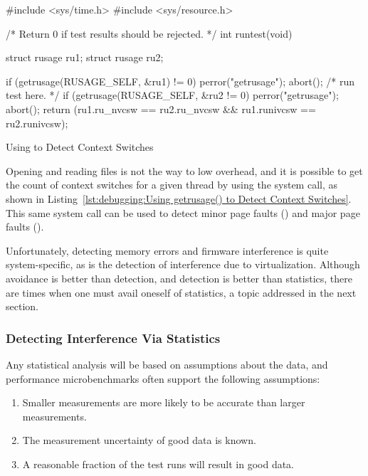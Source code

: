 \begin{listing}[tb]
\begin{fcvlabel}
\begin{VerbatimL}
#include <sys/time.h>
#include <sys/resource.h>

/* Return 0 if test results should be rejected. */
int runtest(void)
{
	struct rusage ru1;
	struct rusage ru2;

	if (getrusage(RUSAGE_SELF, &ru1) != 0) {
		perror("getrusage");
		abort();
	}
	/* run test here. */
	if (getrusage(RUSAGE_SELF, &ru2 != 0) {
		perror("getrusage");
		abort();
	}
	return (ru1.ru_nvcsw == ru2.ru_nvcsw &&
	        ru1.runivcsw == ru2.runivcsw);
}
\end{VerbatimL}
\end{fcvlabel}
\caption{Using  to Detect Context Switches}
\label{lst:debugging:Using getrusage() to Detect Context Switches}
\end{listing}

Opening and reading files is not the way to low overhead, and it is
possible to get the count of context switches for a given thread
by using the  system call, as shown in
Listing~\ref{lst:debugging:Using getrusage() to Detect Context Switches}.
This same system call can be used to detect minor page faults ()
and major page faults ().

Unfortunately, detecting memory errors and firmware interference is quite
system-specific, as is the detection of interference due to virtualization.
Although avoidance is better than detection, and detection is better than
statistics, there are times when one must avail oneself of statistics,
a topic addressed in the next section.

\subsubsection{Detecting Interference Via Statistics}
\label{sec:debugging:Detecting Interference Via Statistics}

Any statistical analysis will be based on assumptions about the data,
and performance microbenchmarks often support the following assumptions:

\begin{enumerate}
\item	Smaller measurements are more likely to be accurate than
	larger measurements.
\item	The measurement uncertainty of good data is known.
\item	A reasonable fraction of the test runs will result in good data.
\end{enumerate}

